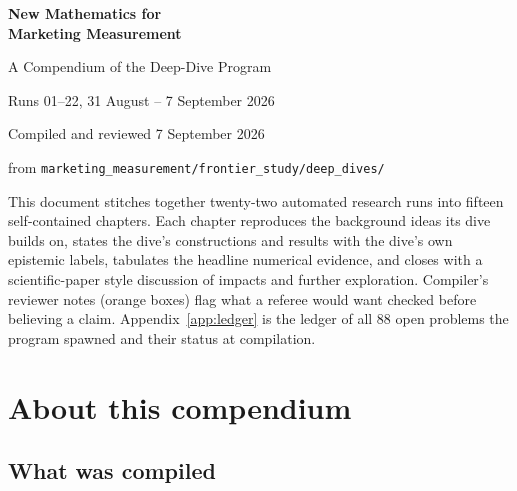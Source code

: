 \begin{titlepage}
\centering
\vspace*{1.6in}
{\Huge\bfseries New Mathematics for\\[4pt] Marketing Measurement\par}
\vspace{14pt}
{\LARGE A Compendium of the Deep-Dive Program\par}
\vspace{10pt}
{\large Runs 01--22, 31 August -- 7 September 2026\par}
\vspace{1.4in}
{\large Compiled and reviewed 7 September 2026\par}
\vspace{6pt}
{\normalsize from \texttt{marketing\_measurement/frontier\_study/deep\_dives/}\par}
\vfill
\begin{minipage}{0.86\textwidth}\small
This document stitches together twenty-two automated research runs into fifteen self-contained chapters.
Each chapter reproduces the background ideas its dive builds on, states the dive's constructions and results
with the dive's own epistemic labels, tabulates the headline numerical evidence, and closes with a
scientific-paper style discussion of impacts and further exploration. Compiler's reviewer notes (orange boxes)
flag what a referee would want checked before believing a claim. Appendix~\ref{app:ledger} is the ledger of all
88 open problems the program spawned and their status at compilation.
\end{minipage}
\vspace{0.5in}
\end{titlepage}

\chapter*{About this compendium}

\section*{What was compiled}

